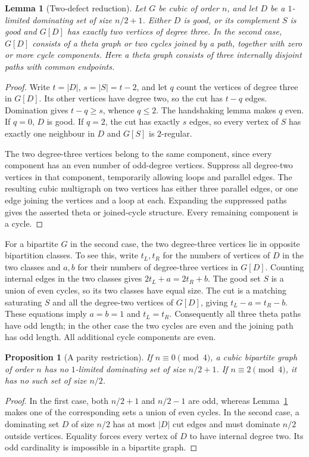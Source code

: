 \documentclass[11pt]{article}
\newtheorem{lemma}[theorem]{Lemma}
\newtheorem{proposition}[theorem]{Proposition}
\begin{document}
\begin{lemma}[Two-defect reduction]\label{lem:two-defect}
Let $G$ be cubic of order $n$, and let $D$ be a $1$-limited
dominating set of size $n/2+1$. Either $D$ is good, or its complement
$S$ is good and $G[D]$ has exactly two vertices of degree three.
In the second case, $G[D]$ consists of a theta graph or two cycles
joined by a path, together with zero or more cycle components.
Here a theta graph consists of three internally disjoint paths
with common endpoints.
\end{lemma}
\begin{proof}
Write $t=|D|$, $s=|S|=t-2$, and let $q$ count the vertices of
degree three in $G[D]$. Its other vertices have degree two, so
the cut has $t-q$ edges. Domination gives $t-q\geq s$, whence
$q\leq2$. The handshaking lemma makes $q$ even.
If $q=0$, $D$ is good. If $q=2$, the cut has exactly $s$ edges,
so every vertex of $S$ has exactly one neighbour in $D$ and
$G[S]$ is $2$-regular.

The two degree-three vertices belong to the same component,
since every component has an even number of odd-degree vertices.
Suppress all degree-two vertices in that component, temporarily
allowing loops and parallel edges. The resulting cubic multigraph
on two vertices has either three parallel edges, or one edge
joining the vertices and a loop at each. Expanding the suppressed
paths gives the asserted theta or joined-cycle structure.
Every remaining component is a cycle.
\end{proof}

For a bipartite $G$ in the second case, the two degree-three
vertices lie in opposite bipartition classes. To see this, write
$t_L,t_R$ for the numbers of vertices of $D$ in the two classes
and $a,b$ for their numbers of degree-three vertices in $G[D]$.
Counting internal edges in the two classes gives
$2t_L+a=2t_R+b$. The good set $S$ is a union of even cycles, so
its two classes have equal size. The cut is a matching saturating
$S$ and all the degree-two vertices of $G[D]$, giving
$t_L-a=t_R-b$. These equations imply $a=b=1$ and $t_L=t_R$.
Consequently all three theta paths have odd length; in the other
case the two cycles are even and the joining path has odd length.
All additional cycle components are even.

\begin{proposition}[A parity restriction]\label{prop:parity}
If $n\equiv0\pmod4$, a cubic bipartite graph of order $n$ has no
$1$-limited dominating set of size $n/2+1$. If $n\equiv2\pmod4$,
it has no such set of size $n/2$.
\end{proposition}
\begin{proof}
In the first case, both $n/2+1$ and $n/2-1$ are odd, whereas
Lemma~\ref{lem:two-defect} makes one of the corresponding sets a
union of even cycles. In the second case, a dominating set $D$
of size $n/2$ has at most $|D|$ cut edges and must dominate
$n/2$ outside vertices. Equality forces every vertex of $D$
to have internal degree two. Its odd cardinality is impossible
in a bipartite graph.
\end{proof}
\end{document}
